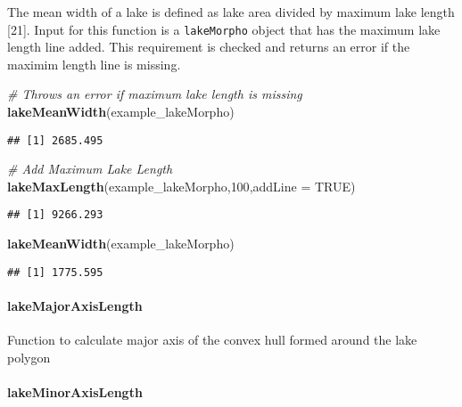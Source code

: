 \documentclass[11pt,]{article}
\newenvironment{Shaded}{\begin{snugshade}}{\end{snugshade}}
\newcommand{\KeywordTok}[1]{\textcolor[rgb]{0.13,0.29,0.53}{\textbf{{#1}}}}
\newcommand{\DataTypeTok}[1]{\textcolor[rgb]{0.13,0.29,0.53}{{#1}}}
\newcommand{\DecValTok}[1]{\textcolor[rgb]{0.00,0.00,0.81}{{#1}}}
\newcommand{\CommentTok}[1]{\textcolor[rgb]{0.56,0.35,0.01}{\textit{{#1}}}}
\newcommand{\OtherTok}[1]{\textcolor[rgb]{0.56,0.35,0.01}{{#1}}}
\newcommand{\NormalTok}[1]{{#1}}
\begin{document}
The mean width of a lake is defined as lake area divided by maximum lake
length {[}21{]}. Input for this function is a \texttt{lakeMorpho} object
that has the maximum lake length line added. This requirement is checked
and returns an error if the maximim length line is missing.

\begin{Shaded}
\begin{Highlighting}[]
\CommentTok{# Throws an error if maximum lake length is missing}
\KeywordTok{lakeMeanWidth}\NormalTok{(example_lakeMorpho)}
\end{Highlighting}
\end{Shaded}

\begin{verbatim}
## [1] 2685.495
\end{verbatim}

\begin{Shaded}
\begin{Highlighting}[]
\CommentTok{# Add Maximum Lake Length}
\KeywordTok{lakeMaxLength}\NormalTok{(example_lakeMorpho,}\DecValTok{100}\NormalTok{,}\DataTypeTok{addLine =} \OtherTok{TRUE}\NormalTok{)}
\end{Highlighting}
\end{Shaded}

\begin{verbatim}
## [1] 9266.293
\end{verbatim}

\begin{Shaded}
\begin{Highlighting}[]
\KeywordTok{lakeMeanWidth}\NormalTok{(example_lakeMorpho)}
\end{Highlighting}
\end{Shaded}

\begin{verbatim}
## [1] 1775.595
\end{verbatim}

\paragraph{lakeMajorAxisLength}\label{lakemajoraxislength}

Function to calculate major axis of the convex hull formed around the
lake polygon

\paragraph{lakeMinorAxisLength}\label{lakeminoraxislength}
\end{document}
